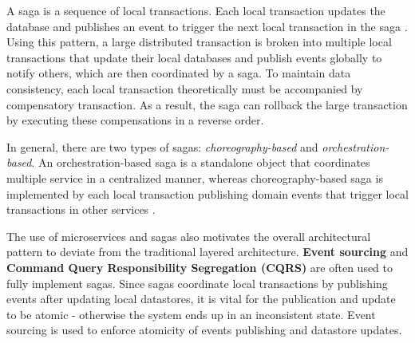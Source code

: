 A saga is a sequence of local transactions. Each local transaction updates the database and publishes an event to trigger the next local transaction in the saga \cite{richardson2014saga}. Using this pattern, a large distributed transaction is broken into multiple local transactions that update their local databases and publish events globally to notify others, which are then coordinated by a saga. To maintain data consistency, each local transaction theoretically must be accompanied by compensatory transaction. As a result, the saga can rollback the large transaction by executing these compensations in a reverse order.

In general, there are two types of sagas: \textit{choreography-based} and \textit{orchestration-based}. An orchestration-based saga is a standalone object that coordinates multiple service in a centralized manner, whereas choreography-based saga is implemented by each local transaction publishing domain events that trigger local transactions in other services \cite{richardson2014saga}.

The use of microservices and sagas also motivates the overall architectural pattern to deviate from the traditional layered architecture. \textbf{Event sourcing} and \textbf{Command Query Responsibility Segregation (CQRS)} are often used to fully implement sagas. Since sagas coordinate local transactions by publishing events after updating local datastores, it is vital for the publication and update to be atomic - otherwise the system ends up in an inconsistent state. Event sourcing is used to enforce atomicity of events publishing and datastore updates.
